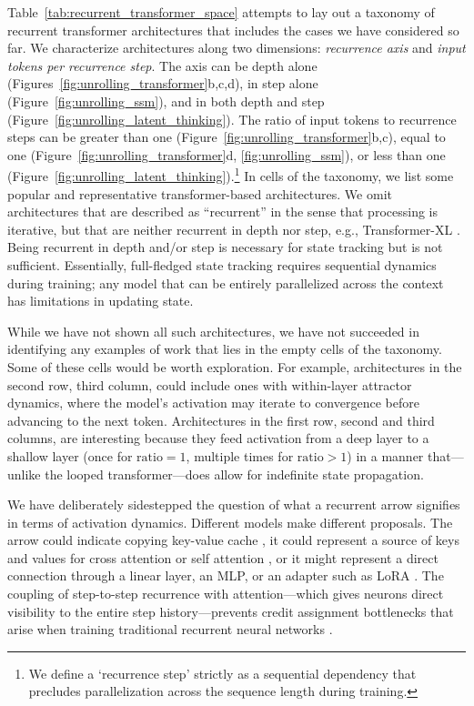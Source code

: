 \documentclass{llmxive}
\begin{document}
Table~\ref{tab:recurrent_transformer_space} attempts to lay out a taxonomy of
recurrent transformer architectures that includes the cases we have considered
so far. We characterize architectures along two dimensions: \emph{recurrence axis} and \emph{input tokens per recurrence step}.  The axis can be depth alone
(Figures~\ref{fig:unrolling_transformer}b,c,d), in step alone
(Figure~\ref{fig:unrolling_ssm}), and in both depth and step
(Figure~\ref{fig:unrolling_latent_thinking}).
The ratio of input tokens to recurrence steps can be greater than one
(Figure~\ref{fig:unrolling_transformer}b,c), equal to one 
(Figure~\ref{fig:unrolling_transformer}d, \ref{fig:unrolling_ssm}), or less
than one (Figure~\ref{fig:unrolling_latent_thinking}).\footnote{We define a `recurrence step' strictly as a sequential dependency that precludes parallelization across the sequence length during training.}
In cells of the 
taxonomy, we list some popular and representative transformer-based architectures. 
We omit architectures that are described as ``recurrent'' in the sense
that processing is iterative, but that are neither recurrent in depth nor
step, e.g., Transformer-XL \citep{dai2019transformerxlattentivelanguagemodels}.
Being recurrent in depth and/or step is necessary for state tracking but is not sufficient.
Essentially, full-fledged state tracking requires sequential dynamics during training; any model that
can be entirely parallelized across the context has limitations in updating state.

While we have not shown all such architectures, we have not succeeded in identifying
any examples of work that lies in the empty cells of the taxonomy. Some of these
cells would be worth exploration.
For example, architectures in the second row, third column, 
could include ones with within-layer attractor dynamics, where the model's 
activation may iterate to convergence before advancing
to the next token. Architectures in the first row, second and third columns, are
interesting because they feed activation from a deep layer to a shallow layer (once 
for $\text{ratio}=1$, multiple times for $\text{ratio}>1$) in a manner that---unlike
the looped  transformer---does allow for indefinite state propagation.

We have deliberately sidestepped the question of what a recurrent arrow signifies
in terms of activation dynamics. Different models make different proposals.
The arrow could indicate copying key-value cache \citep{yang2024kvsharer}, it could represent a source 
of keys and values for cross attention \citep{fan2021} or self attention \citep{oncescu2026}, or it might represent a direct connection through a linear layer,
an MLP, or an adapter such as LoRA \citep{hu2022lora}.
The coupling of step-to-step recurrence with attention---which gives neurons direct visibility to the 
entire  step history---prevents credit assignment bottlenecks that arise when training traditional
recurrent neural networks \citep{Ke2018,oncescu2026}.
\end{document}
